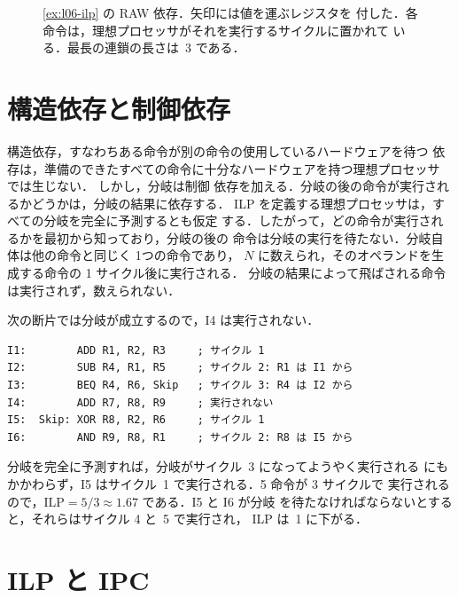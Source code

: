\documentclass[../main.tex]{subfiles}
\begin{document}
\begin{figure}[htbp]
  \centering
  
  \caption{\cref{ex:l06-ilp} の RAW 依存．矢印には値を運ぶレジスタを
    付した．各命令は，理想プロセッサがそれを実行するサイクルに置かれて
    いる．最長の連鎖の長さは~3 である．}
  \label{fig:l06-ilp-graph}
\end{figure}

\section{構造依存と制御依存}
\label{sec:l06-control}

構造依存，すなわちある命令が別の命令の使用しているハードウェアを待つ
依存は，準備のできたすべての命令に十分なハードウェアを持つ理想プロセッサ
では生じない．%
しかし，分岐は制御
依存を加える．分岐の後の命令が実行されるかどうかは，分岐の結果に依存する．
ILP を定義する理想プロセッサは，すべての分岐を完全に予測するとも仮定
する．したがって，どの命令が実行されるかを最初から知っており，分岐の後の
命令は分岐の実行を待たない．分岐自体は他の命令と同じく 1つの命令であり，
$N$ に数えられ，そのオペランドを生成する命令の 1 サイクル後に実行される．
分岐の結果によって飛ばされる命令は実行されず，数えられない．%

\begin{example}
  \label{ex:l06-control}
  次の断片では分岐が成立するので，I4 は実行されない．
  \begin{lstlisting}[language={[x86masm]Assembler}, numbers=none]
I1:        ADD R1, R2, R3     ; サイクル 1
I2:        SUB R4, R1, R5     ; サイクル 2: R1 は I1 から
I3:        BEQ R4, R6, Skip   ; サイクル 3: R4 は I2 から
I4:        ADD R7, R8, R9     ; 実行されない
I5:  Skip: XOR R8, R2, R6     ; サイクル 1
I6:        AND R9, R8, R1     ; サイクル 2: R8 は I5 から
\end{lstlisting}
  分岐を完全に予測すれば，分岐がサイクル~3 になってようやく実行される
  にもかかわらず，I5 はサイクル~1 で実行される．5 命令が 3 サイクルで
  実行されるので，$\text{ILP} = 5/3 \approx 1.67$ である．I5 と I6 が分岐
  を待たなければならないとすると，それらはサイクル 4 と~5 で実行され，
  ILP は~1 に下がる．
\end{example}

\section{ILP と IPC}
\label{sec:l06-ipc}
\end{document}
